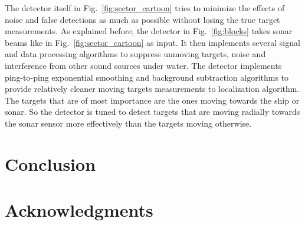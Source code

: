 \documentclass{article} %
\begin{document}
The detector itself in Fig.~\ref{fig:sector_cartoon} tries to minimize the effects of noise and false detections
as much as possible without losing the true target measurements. As explained before, the
detector in Fig.~\ref{fig:blocks} takes sonar beams like in Fig.~\ref{fig:sector_cartoon} as input. It then implements several
signal and data processing algorithms to suppress unmoving targets, noise and interference
from other sound sources under water. The detector implements ping-to-ping exponential
smoothing and background subtraction algorithms to provide relatively cleaner moving targets
measurements to localization algorithm. The targets that are of most importance are the ones
moving towards the ship or sonar. So the detector is tuned to detect targets that are moving
radially towards the sonar sensor more effectively than the targets moving otherwise.

\section{Conclusion}

\section*{Acknowledgments}
\end{document}
